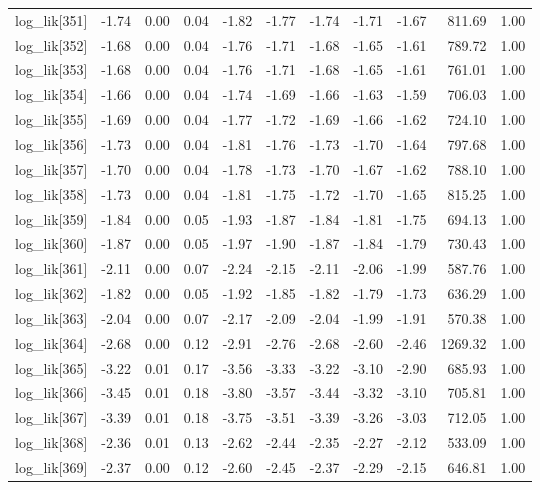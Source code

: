 \begin{table}[ht]
\begin{tabular}{rrrrrrrrrrr}
  log\_lik[351] & -1.74 & 0.00 & 0.04 & -1.82 & -1.77 & -1.74 & -1.71 & -1.67 & 811.69 & 1.00 \\ 
  log\_lik[352] & -1.68 & 0.00 & 0.04 & -1.76 & -1.71 & -1.68 & -1.65 & -1.61 & 789.72 & 1.00 \\ 
  log\_lik[353] & -1.68 & 0.00 & 0.04 & -1.76 & -1.71 & -1.68 & -1.65 & -1.61 & 761.01 & 1.00 \\ 
  log\_lik[354] & -1.66 & 0.00 & 0.04 & -1.74 & -1.69 & -1.66 & -1.63 & -1.59 & 706.03 & 1.00 \\ 
  log\_lik[355] & -1.69 & 0.00 & 0.04 & -1.77 & -1.72 & -1.69 & -1.66 & -1.62 & 724.10 & 1.00 \\ 
  log\_lik[356] & -1.73 & 0.00 & 0.04 & -1.81 & -1.76 & -1.73 & -1.70 & -1.64 & 797.68 & 1.00 \\ 
  log\_lik[357] & -1.70 & 0.00 & 0.04 & -1.78 & -1.73 & -1.70 & -1.67 & -1.62 & 788.10 & 1.00 \\ 
  log\_lik[358] & -1.73 & 0.00 & 0.04 & -1.81 & -1.75 & -1.72 & -1.70 & -1.65 & 815.25 & 1.00 \\ 
  log\_lik[359] & -1.84 & 0.00 & 0.05 & -1.93 & -1.87 & -1.84 & -1.81 & -1.75 & 694.13 & 1.00 \\ 
  log\_lik[360] & -1.87 & 0.00 & 0.05 & -1.97 & -1.90 & -1.87 & -1.84 & -1.79 & 730.43 & 1.00 \\ 
  log\_lik[361] & -2.11 & 0.00 & 0.07 & -2.24 & -2.15 & -2.11 & -2.06 & -1.99 & 587.76 & 1.00 \\ 
  log\_lik[362] & -1.82 & 0.00 & 0.05 & -1.92 & -1.85 & -1.82 & -1.79 & -1.73 & 636.29 & 1.00 \\ 
  log\_lik[363] & -2.04 & 0.00 & 0.07 & -2.17 & -2.09 & -2.04 & -1.99 & -1.91 & 570.38 & 1.00 \\ 
  log\_lik[364] & -2.68 & 0.00 & 0.12 & -2.91 & -2.76 & -2.68 & -2.60 & -2.46 & 1269.32 & 1.00 \\ 
  log\_lik[365] & -3.22 & 0.01 & 0.17 & -3.56 & -3.33 & -3.22 & -3.10 & -2.90 & 685.93 & 1.00 \\ 
  log\_lik[366] & -3.45 & 0.01 & 0.18 & -3.80 & -3.57 & -3.44 & -3.32 & -3.10 & 705.81 & 1.00 \\ 
  log\_lik[367] & -3.39 & 0.01 & 0.18 & -3.75 & -3.51 & -3.39 & -3.26 & -3.03 & 712.05 & 1.00 \\ 
  log\_lik[368] & -2.36 & 0.01 & 0.13 & -2.62 & -2.44 & -2.35 & -2.27 & -2.12 & 533.09 & 1.00 \\ 
  log\_lik[369] & -2.37 & 0.00 & 0.12 & -2.60 & -2.45 & -2.37 & -2.29 & -2.15 & 646.81 & 1.00 \\ 

\end{tabular}
\end{table}
